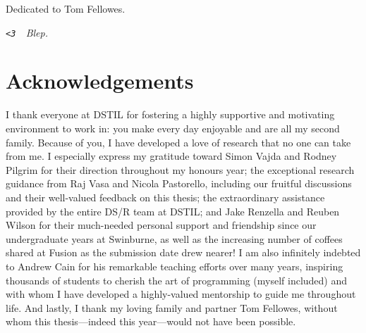 \cleardoublepage
\pagestyle{empty}
\begin{center}
  \vspace*{0.3\paperheight}
  Dedicated to Tom Fellowes.
  
  {\color{white} \itshape \verb!<3!~~Blep.}
\end{center}
\pagestyle{fancy}

\chapter*{Acknowledgements}

I thank everyone at DSTIL for fostering a highly supportive and motivating environment to work in: you make every day enjoyable and are all my second family. Because of you, I have developed a love of research that no one can take from me. I especially express my gratitude toward Simon Vajda and Rodney Pilgrim for their direction throughout my honours year; the exceptional research guidance from Raj Vasa and Nicola Pastorello, including our fruitful discussions and their well-valued feedback on this thesis; the extraordinary assistance provided by the entire DS/R team at DSTIL; and Jake Renzella and Reuben Wilson for their much-needed personal support and friendship since our undergraduate years at Swinburne, as well as the increasing number of coffees shared at Fusion as the submission date drew nearer! I am also infinitely indebted to Andrew Cain for his remarkable teaching efforts over many years, inspiring thousands of students to cherish the art of programming (myself included) and with whom I have developed a highly-valued mentorship to guide me throughout life. And lastly, I thank my loving family and partner Tom Fellowes, without whom this thesis---indeed this year---would not have been possible.